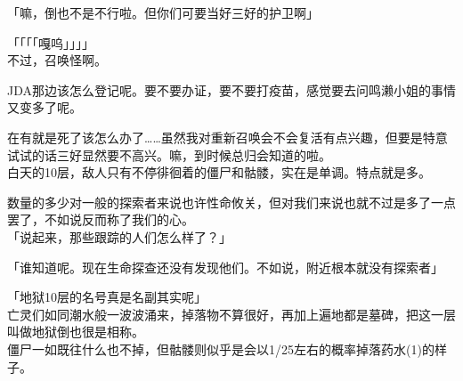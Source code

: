 「嘛，倒也不是不行啦。但你们可要当好三好的护卫啊」

「「「「嘎呜」」」」\\

不过，召唤怪啊。

JDA那边该怎么登记呢。要不要办证，要不要打疫苗，感觉要去问鸣濑小姐的事情又变多了呢。

在有就是死了该怎么办了……虽然我对重新召唤会不会复活有点兴趣，但要是特意试试的话三好显然要不高兴。嘛，到时候总归会知道的啦。\\

% 
 

白天的10层，敌人只有不停徘徊着的僵尸和骷髅，实在是单调。特点就是多。

数量的多少对一般的探索者来说也许性命攸关，但对我们来说也就不过是多了一点罢了，不如说反而称了我们的心。\\

「说起来，那些跟踪的人们怎么样了？」

「谁知道呢。现在生命探查还没有发现他们。不如说，附近根本就没有探索者」

「地狱10层的名号真是名副其实呢」\\

亡灵们如同潮水般一波波涌来，掉落物不算很好，再加上遍地都是墓碑，把这一层叫做地狱倒也很是相称。\\

僵尸一如既往什么也不掉，但骷髅则似乎是会以1/25左右的概率掉落药水(1)的样子。\\

